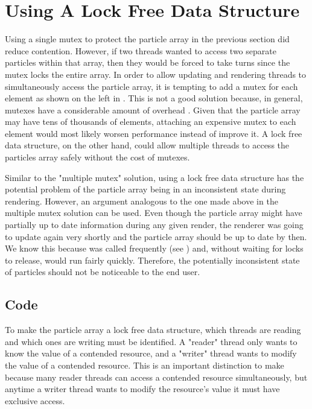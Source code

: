 \section{Using A Lock Free Data Structure}\label{sec:studies_lock_free}

Using a single mutex to protect the particle array in the previous section did reduce contention. However, if two threads wanted to access two separate particles within that array, then they would be forced to take turns since the mutex locks the entire array. In order to allow updating and rendering threads to simultaneously access the particle array, it is tempting to add a mutex for each element as shown on the left in . This is not a good solution because, in general, mutexes have a considerable amount of overhead \cite{ArangoDBLocklessAndMutex}. Given that the particle array may have tens of thousands of elements, attaching an expensive mutex to each element would most likely worsen performance instead of improve it. A lock free data structure, on the other hand, could allow multiple threads to access the particles array safely without the cost of mutexes. 

Similar to the "multiple mutex" solution, using a lock free data structure has the potential problem of the particle array being in an inconsistent state during rendering. However, an argument analogous to the one made above in the multiple mutex solution can be used. Even though the particle array might have partially up to date information during any given render, the renderer was going to update again very shortly and the particle array should be up to date by then. We know this because  was called frequently (see ) and, without waiting for locks to release,  would run fairly quickly. Therefore, the potentially inconsistent state of particles should not be noticeable to the end user. 

\subsection{Code}\label{ssec:studies_lock_free_code}

To make the particle array a lock free data structure, which threads are reading and which ones are writing must be identified. A "reader" thread only wants to know the value of a contended resource, and a "writer" thread wants to modify the value of a contended resource. This is an important distinction to make because many reader threads can access a contended resource simultaneously, but anytime a writer thread wants to modify the resource's value it must have exclusive access.  

